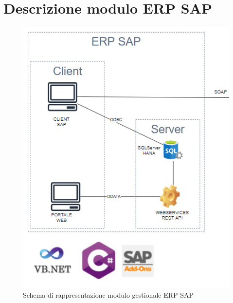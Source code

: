 \section{Descrizione modulo ERP SAP}
\begin{figure}[!h] 
	\centering 
	\includegraphics[scale = 1.2]{immagini/modulo-sap.png} 
	\caption{Schema di rappresentazione modulo gestionale ERP SAP}
\end{figure}

